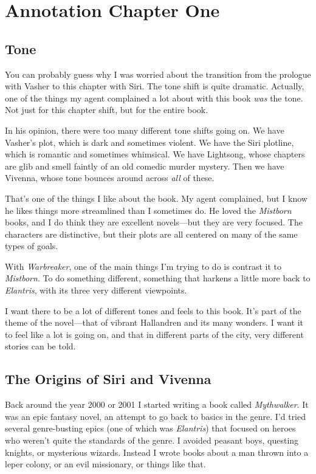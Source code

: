 \section{Annotation Chapter One}

\subsection*{Tone}

You can probably guess why I was worried about the transition from the prologue with Vasher to this chapter with Siri. The tone shift is quite dramatic. Actually, one of the things my agent complained a lot about with this book \textit{was} the tone. Not just for this chapter shift, but for the entire book.

In his opinion, there were too many different tone shifts going on. We have Vasher’s plot, which is dark and sometimes violent. We have the Siri plotline, which is romantic and sometimes whimsical. We have Lightsong, whose chapters are glib and smell faintly of an old comedic murder mystery. Then we have Vivenna, whose tone bounces around across \textit{all} of these.

That’s one of the things I like about the book. My agent complained, but I know he likes things more streamlined than I sometimes do. He loved the \textit{Mistborn} books, and I do think they are excellent novels—but they are very focused. The characters are distinctive, but their plots are all centered on many of the same types of goals.

With \textit{Warbreaker}, one of the main things I’m trying to do is contrast it to \textit{Mistborn}. To do something different, something that harkens a little more back to \textit{Elantris}, with its three very different viewpoints.

I want there to be a lot of different tones and feels to this book. It’s part of the theme of the novel—that of vibrant Hallandren and its many wonders. I want it to feel like a lot is going on, and that in different parts of the city, very different stories can be told.

\subsection*{The Origins of Siri and Vivenna}

Back around the year 2000 or 2001 I started writing a book called \textit{Mythwalker}. It was an epic fantasy novel, an attempt to go back to basics in the genre. I’d tried several genre-busting epics (one of which was \textit{Elantris}) that focused on heroes who weren’t quite the standards of the genre. I avoided peasant boys, questing knights, or mysterious wizards. Instead I wrote books about a man thrown into a leper colony, or an evil missionary, or things like that.

